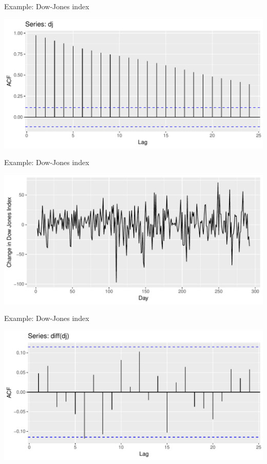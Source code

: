 \documentclass[14pt,ignorenonframetext,]{beamer}
\begin{document}
\begin{frame}{Example: Dow-Jones index}

\includegraphics{week_5_arima_files/figure-beamer/unnamed-chunk-10-1.pdf}

\end{frame}

\begin{frame}{Example: Dow-Jones index}

\includegraphics{week_5_arima_files/figure-beamer/unnamed-chunk-11-1.pdf}

\end{frame}

\begin{frame}{Example: Dow-Jones index}

\includegraphics{week_5_arima_files/figure-beamer/unnamed-chunk-12-1.pdf}

\end{frame}
\end{document}

